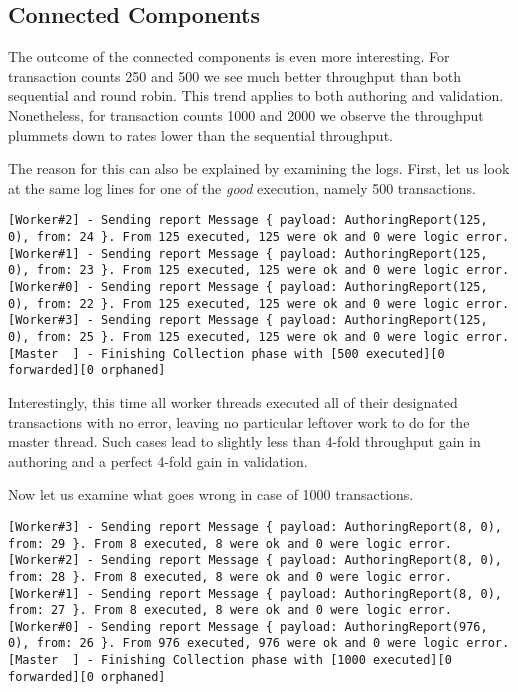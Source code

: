\subsection*{Connected Components}
The outcome of the connected components is even more interesting. For transaction counts
	250 and 500 we see much better throughput than both sequential and round robin. This trend
	applies to both authoring and validation. Nonetheless, for transaction counts 1000 and 2000 we
	observe the throughput plummets down to rates lower than the sequential throughput.

	The reason for this can also be explained by examining the logs. First, let us look at the
	same log lines for one of the \textit{good} execution, namely 500 transactions.

	\begin{lstlisting}
[Worker#2] - Sending report Message { payload: AuthoringReport(125, 0), from: 24 }. From 125 executed, 125 were ok and 0 were logic error.
[Worker#1] - Sending report Message { payload: AuthoringReport(125, 0), from: 23 }. From 125 executed, 125 were ok and 0 were logic error.
[Worker#0] - Sending report Message { payload: AuthoringReport(125, 0), from: 22 }. From 125 executed, 125 were ok and 0 were logic error.
[Worker#3] - Sending report Message { payload: AuthoringReport(125, 0), from: 25 }. From 125 executed, 125 were ok and 0 were logic error.
[Master  ] - Finishing Collection phase with [500 executed][0 forwarded][0 orphaned]
	\end{lstlisting}

	Interestingly, this time all worker threads executed all of their designated transactions with
	no error, leaving no particular leftover work to do for the master thread. Such cases lead to
	slightly less than 4-fold throughput gain in authoring and a perfect 4-fold gain in validation.

	Now let us examine what goes wrong in case of 1000 transactions.

	\begin{lstlisting}
[Worker#3] - Sending report Message { payload: AuthoringReport(8, 0), from: 29 }. From 8 executed, 8 were ok and 0 were logic error.
[Worker#2] - Sending report Message { payload: AuthoringReport(8, 0), from: 28 }. From 8 executed, 8 were ok and 0 were logic error.
[Worker#1] - Sending report Message { payload: AuthoringReport(8, 0), from: 27 }. From 8 executed, 8 were ok and 0 were logic error.
[Worker#0] - Sending report Message { payload: AuthoringReport(976, 0), from: 26 }. From 976 executed, 976 were ok and 0 were logic error.
[Master  ] - Finishing Collection phase with [1000 executed][0 forwarded][0 orphaned]
	\end{lstlisting}

